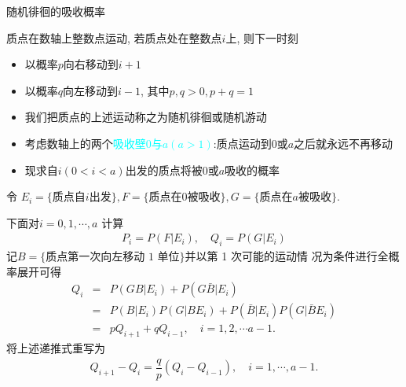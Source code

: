 \begin{frame}{随机徘徊的吸收概率}
	\begin{exam}
		质点在数轴上整数点运动, 若质点处在整数点$i$上, 则下一时刻%
		\begin{itemize}[<+-|alert@+>]
			\item  以概率$p$向右移动到$i+1$
			\item 以概率$q$向左移动到$i-1$, 其中$p,q>0, p+q=1$
			\item 我们把质点的上述运动称之为随机徘徊或随机游动
			\item 考虑数轴上的两个\textcolor{cyan}{吸收壁$0$与$a(a>1)$}:质点运动到$0$或$a$之后就永远不再移动
			\item 现求自$i(0<i<a)$出发的质点将被$0$或$a$吸收的概率
		\end{itemize}
	\end{exam}
\end{frame}


\begin{frame}
	\vspace{0.5cm}
	\hspace{-0.2cm}\jieda 令 $E_i=\{\mbox{质点自}i\mbox{出发}\}, F=\{\mbox{质点在}0\mbox{被吸收}\}, G=\{\mbox{质点在}a\mbox{被吸收}\}$. \pause

	下面对$i=0,1,\cdots,a$ 计算
	\begin{eqnarray*}
		P_i=P(F|E_i), \quad Q_i=P(G|E_i)
	\end{eqnarray*}
	\pause 记$B=\{\mbox{质点第一次向左移动 1 单位}\}$并以第 1 次可能的运动情
	况为条件进行全概率展开可得
	\begin{eqnarray*}
		Q_i&=&P(GB|E_i)+P(G\bar{B}|E_i)\\
		&=&P(B|E_i)P(G|BE_i)+P(\bar{B}|E_i)P(G|\bar{B}E_i)\\
		&=&pQ_{i+1}+qQ_{i-1}, \quad i=1,2,\cdots a-1.
	\end{eqnarray*}
	\pause 将上述递推式重写为
	\begin{eqnarray}\label{eq:ditui1}
		Q_{i+1}-Q_i=\dfrac{q}{p}(Q_i-Q_{i-1}), \quad i=1,\cdots, a-1.
	\end{eqnarray}

\end{frame}

